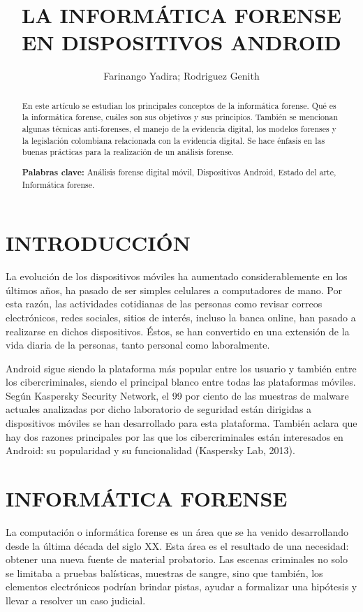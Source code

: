 \documentclass[times,5p, twocolumn]{elsarticle}
\begin{document}
\begin{frontmatter}
\title{LA INFORMÁTICA FORENSE EN DISPOSITIVOS ANDROID\\ }

\author{Farinango Yadira; Rodriguez Genith\\
}

\begin{abstract}
En este artículo se estudian los principales conceptos de la informática forense. Qué
es la informática forense, cuáles son sus objetivos y sus principios. También se mencionan
algunas técnicas anti-forenses, el manejo de la evidencia digital, los modelos forenses y la
legislación colombiana relacionada con la evidencia digital. Se hace énfasis en las buenas
prácticas para la realización de un análisis forense.

\textbf{Palabras clave:} Análisis forense digital móvil, Dispositivos Android, Estado del arte,
Informática forense.
\end{abstract}

\end{frontmatter}

\section{INTRODUCCIÓN}
\noindent
La evolución de los dispositivos móviles
ha aumentado considerablemente en los
últimos años, ha pasado de ser simples
celulares a computadores de mano. Por esta razón, las actividades cotidianas de las
personas como revisar correos
electrónicos, redes sociales, sitios de
interés, incluso la banca online, han pasado
a realizarse en dichos dispositivos. Éstos,
se han convertido en una extensión de la vida diaria de la personas, tanto personal
como laboralmente. 

Android sigue siendo la plataforma más
popular entre los usuario y también entre
los cibercriminales, siendo el principal
blanco entre todas las plataformas móviles.
Según Kaspersky Security Network, el
99 por ciento de las muestras de malware actuales
analizadas por dicho laboratorio de
seguridad están dirigidas a dispositivos
móviles se han desarrollado para esta
plataforma. También aclara que hay dos
razones principales por las que los
cibercriminales están interesados en
Android: su popularidad y su
funcionalidad (Kaspersky Lab, 2013).

\section{INFORMÁTICA FORENSE}
La computación o informática forense es
un área que se ha venido desarrollando
desde la última década del siglo XX. Esta
área es el resultado de una necesidad:
obtener una nueva fuente de material
probatorio. Las escenas criminales no solo
se limitaba a pruebas balísticas, muestras
de sangre, sino que también, los elementos
electrónicos podrían brindar pistas, ayudar
a formalizar una hipótesis y llevar a
resolver un caso judicial. 
\end{document}
